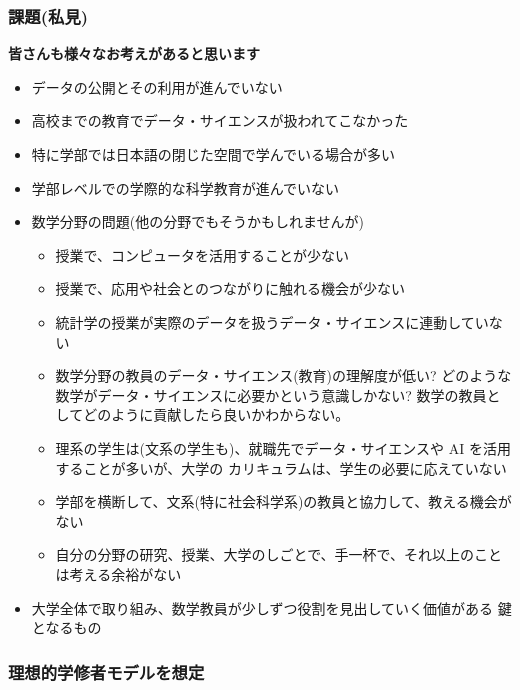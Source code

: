 \documentclass[
]{book}
\providecommand{\tightlist}{%
  \setlength{\itemsep}{0pt}\setlength{\parskip}{0pt}}
\theoremstyle{definition}
\theoremstyle{definition}
\theoremstyle{definition}
\theoremstyle{definition}
\theoremstyle{remark}
\begin{document}
\hypertarget{ux8ab2ux984cux79c1ux898b}{%
\subsubsection{課題(私見)}\label{ux8ab2ux984cux79c1ux898b}}

\textbf{皆さんも様々なお考えがあると思います}

\begin{itemize}
\item
  データの公開とその利用が進んでいない
\item
  高校までの教育でデータ・サイエンスが扱われてこなかった
\item
  特に学部では日本語の閉じた空間で学んでいる場合が多い
\item
  学部レベルでの学際的な科学教育が進んでいない
\item
  数学分野の問題(他の分野でもそうかもしれませんが)

  \begin{itemize}
  \tightlist
  \item
    授業で、コンピュータを活用することが少ない
  \item
    授業で、応用や社会とのつながりに触れる機会が少ない
  \item
    統計学の授業が実際のデータを扱うデータ・サイエンスに連動していない
  \item
    数学分野の教員のデータ・サイエンス(教育)の理解度が低い?
    どのような数学がデータ・サイエンスに必要かという意識しかない?
    数学の教員としてどのように貢献したら良いかわからない。
  \item
    理系の学生は(文系の学生も)、就職先でデータ・サイエンスや AI を活用することが多いが、大学の カリキュラムは、学生の必要に応えていない
  \item
    学部を横断して、文系(特に社会科学系)の教員と協力して、教える機会がない
  \item
    自分の分野の研究、授業、大学のしごとで、手一杯で、それ以上のことは考える余裕がない
  \end{itemize}
\item
  大学全体で取り組み、数学教員が少しずつ役割を見出していく価値がある 鍵となるもの
\end{itemize}

\hypertarget{ux7406ux60f3ux7684ux5b66ux4feeux8005ux30e2ux30c7ux30ebux3092ux60f3ux5b9a}{%
\subsubsection{理想的学修者モデルを想定}\label{ux7406ux60f3ux7684ux5b66ux4feeux8005ux30e2ux30c7ux30ebux3092ux60f3ux5b9a}}
\end{document}
